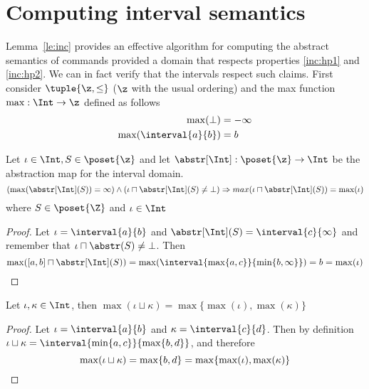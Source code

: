 \section{Computing interval semantics}
\label{sec:computingint}

Lemma~\ref{le:inc} provides an effective algorithm for computing the
abstract semantics of commands provided a domain that respects
properties \ref{inc:hp1} and \ref{inc:hp2}. We can in fact verify that
the intervals respect such claims. First consider \(\tuple{\z, \leq}\)
(\(\z\) with the usual ordering) and the max function
\(\max : \Int \to \z\) defined as follows
\begin{align*}
  \max(\bot) & = -\infty \\
  \max(\interval{a}{b}) & = b
\end{align*}

\begin{observation}
  Let \(\iota \in \Int, S \in \poset{\z}\) and let
  \({\abstr[\Int] : \poset{\z} \to \Int}\) be the abstraction map for
  the interval domain. 
  \begin{equation*}
    \left(\max(\abstr[\Int](S)) = \infty\right) \land \left(\iota \sqcap \abstr[\Int](S) \neq \bot\right)
    \Rightarrow max(\iota \sqcap \abstr[\Int](S)) = \max(\iota)
  \end{equation*}
  where \(S \in \poset{\Z}\) and \(\iota \in \Int\)
\end{observation}

\begin{proof}
  Let \(\iota = \interval{a}{b}\) and
  \(\abstr[\Int](S) = \interval{c}{\infty}\) and remember that
  \({\iota \sqcap \abstr(S) \neq \bot}\). Then
  \begin{equation*}
    \max([a,b] \sqcap \abstr[\Int](S)) = \max(\interval{\max\{a, c\}}{\min\{b , \infty\}}) = b = \max(\iota) \qedhere
  \end{equation*}
\end{proof}

\begin{observation}
  Let \(\iota, \kappa \in \Int\), then
  \(\max(\iota \sqcup \kappa) = \max\{\max(\iota), \max(\kappa)\}\)
\end{observation}

\begin{proof}
  Let \(\iota = \interval{a}{b}\) and \(\kappa =
  \interval{c}{d}\). Then by definition
  \(\iota \sqcup \kappa = \interval{\min\{a,c\}}{\max\{b,d\}}\), and
  therefore
  \begin{equation*}
    \max(\iota \sqcup \kappa) = \max\{b,d\} = \max\{\max(\iota), \max(\kappa)\} \qedhere
  \end{equation*}
\end{proof}

